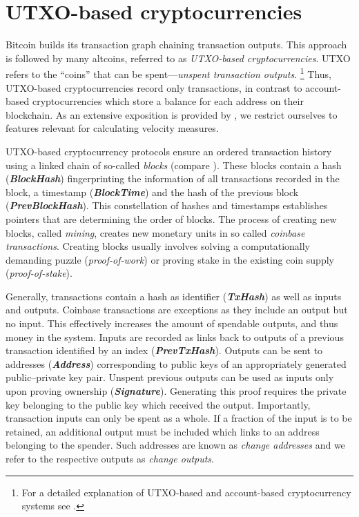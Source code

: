 \section{UTXO-based cryptocurrencies}
\label{sec:concept_utxo}%

Bitcoin builds its transaction graph chaining transaction outputs. %
This approach is followed by many altcoins, referred to as %
\emph{UTXO-based cryptocurrencies}. %
UTXO refers to the ``coins'' that can be spent---\emph{unspent transaction
  outputs}.%
\footnote{For a detailed explanation of UTXO-based and account-based %
  cryptocurrency systems see \cite{zahnentferner2018chimeric}.} %
Thus, UTXO-based cryptocurrencies record only transactions, in contrast to
account-based cryptocurrencies which store a balance for each address on
their blockchain. %
As an extensive exposition is provided by \cite{tschorsch2016bitcoin}, we
restrict ourselves to features relevant for calculating velocity measures. %

UTXO-based cryptocurrency protocols ensure an ordered transaction history
using a linked chain of so-called \textit{blocks} (compare
). %
These blocks contain a hash ({\ttfamily\bfseries\slshape BlockHash})
fingerprinting the information of all transactions recorded in the block, a
timestamp ({\ttfamily\bfseries\slshape BlockTime}) and the hash of the
previous block ({\ttfamily\bfseries\slshape PrevBlockHash}). %
This constellation of hashes and timestamps establishes pointers that are
determining the order of blocks. %
The process of creating new blocks, called \emph{mining}, creates new
monetary units in so called \emph{coinbase transactions}. %
Creating blocks usually involves solving a computationally demanding puzzle
(\emph{proof-of-work}) or proving stake in the existing coin supply
(\emph{proof-of-stake}). %

Generally, transactions contain a hash as identifier
({\ttfamily\bfseries\slshape TxHash}) as well as inputs and outputs. %
Coinbase transactions are exceptions as they include an output but no
input. %
This effectively increases the amount of spendable outputs, and thus money in
the system. %
Inputs are recorded as links back to outputs of a previous transaction
identified by an index ({\ttfamily\bfseries\slshape PrevTxHash}). %
Outputs can be sent to addresses ({\ttfamily\bfseries\slshape Address})
corresponding to public keys of an appropriately generated public--private
key pair. %
Unspent previous outputs can be used as inputs only upon proving ownership
({\ttfamily\bfseries\slshape Signature}). %
Generating this proof requires the private key belonging to the public key
which received the output. %
Importantly, transaction inputs can only be spent as a whole. %
If a fraction of the input is to be retained, an additional output must be
included which links to an address belonging to the spender. %
Such addresses are known as \textit{change addresses} and we refer to the
respective outputs as \textit{change outputs}. %

